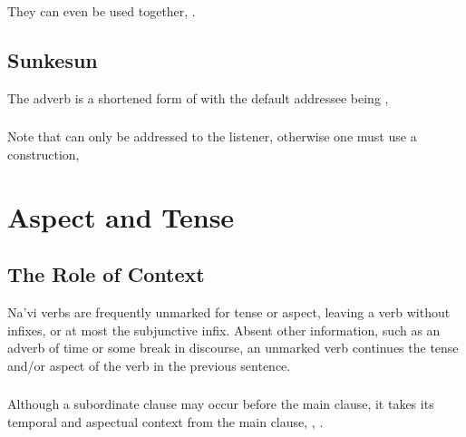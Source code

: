 \subsubsection{} They can even be used together,  .

\subsection{Sunkesun} The adverb  
is a shortened form of  with the default addressee
being ,  

\subsubsection{} Note that  can only be addressed to the
listener, otherwise one must use a 
construction,  


\section{Aspect and Tense}

\subsection{The Role of Context} Na'vi verbs are frequently unmarked
for tense or aspect, leaving a verb without infixes, or at most the
subjunctive infix.  Absent other information, such as an adverb of
time or some break in discourse, an unmarked verb continues the tense
and/or aspect of the verb in the previous sentence.

\subsubsection{} Although a subordinate clause may occur before the
main clause, it takes its temporal and aspectual context from the main
clause,  ,  .

